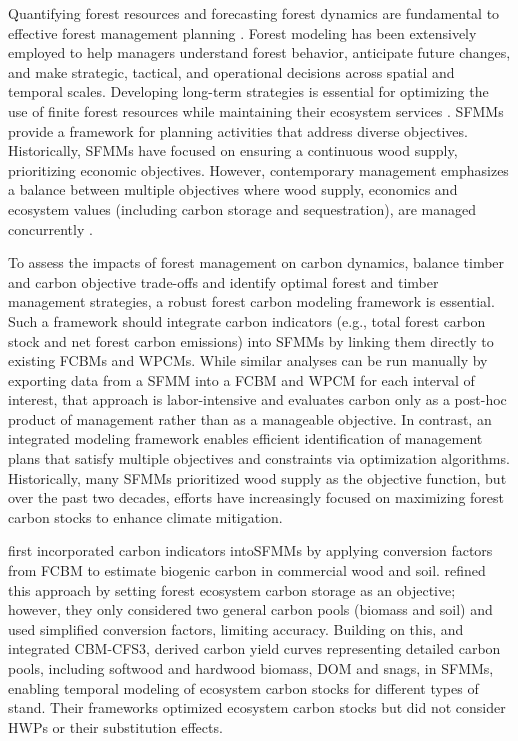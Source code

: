 \documentclass[preprint,12pt,authoryear]{elsarticle}
\begin{document}
\begin{linenumbers}
Quantifying forest resources and forecasting forest dynamics are fundamental to effective forest management planning \citep{gunn2007models}. Forest modeling has been extensively employed to help managers understand forest behavior, anticipate future changes, and make strategic, tactical, and operational decisions across spatial and temporal scales. Developing long-term strategies is essential for optimizing the use of finite forest resources while maintaining their ecosystem services \citep{martin2013optimization}. \Acp{SFMM} provide a framework for planning activities that address diverse objectives. Historically, \acp{SFMM} have focused on ensuring a continuous wood supply, prioritizing economic objectives. However, contemporary management emphasizes a balance between multiple objectives where wood supply, economics and ecosystem values (including carbon storage and sequestration), are managed concurrently \citep{gunn2007models}. 

To assess the impacts of forest management on carbon dynamics, balance timber and carbon objective trade-offs and identify optimal forest and timber management strategies, a robust forest carbon modeling framework is essential. Such a framework should integrate carbon indicators (e.g., total forest carbon stock and net forest carbon emissions) into \acp{SFMM} by linking them directly to existing \acp{FCBM} and \acp{WPCM}. While similar analyses can be run manually by exporting data from a \ac{SFMM} into a \ac{FCBM} and \ac{WPCM} for each interval of interest, that approach is labor-intensive and evaluates carbon only as a post-hoc product of management rather than as a manageable objective. 
In contrast, an integrated modeling framework enables efficient identification of management plans that satisfy multiple objectives and constraints via optimization algorithms. Historically, many \acp{SFMM} prioritized wood supply as the objective function, but over the past two decades, efforts have increasingly focused on maximizing forest carbon stocks to enhance climate mitigation.

\cite{meng2003combining} first incorporated carbon indicators into\acp{SFMM} by applying conversion factors from \ac{FCBM} to estimate biogenic carbon in commercial wood and soil. \cite{bourque2007optimizing} refined this approach by setting forest ecosystem carbon storage as an objective; however, they only considered two general carbon pools (biomass and soil) and used simplified conversion factors, limiting accuracy. Building on this, \cite{hennigar2008novel} and \cite{neilson2008optimal} integrated \ac{CBM-CFS3}, derived carbon yield curves representing detailed carbon pools, including softwood and hardwood biomass, DOM and snags, in \acp{SFMM}, enabling temporal modeling of ecosystem carbon stocks for different  types of stand. Their frameworks optimized ecosystem carbon stocks but did not consider \acp{HWP} or their substitution effects.


\end{linenumbers}
\end{document}
